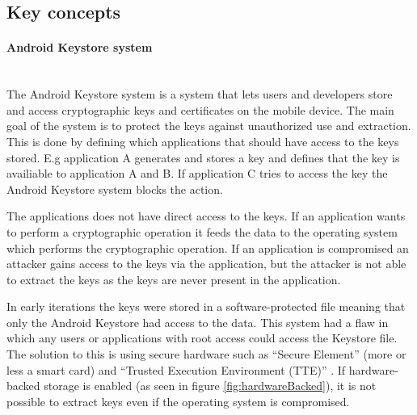\subsection{Key concepts}

\paragraph{Android Keystore system}\mbox{}\\
The Android Keystore system is a system that lets users and developers store and access cryptographic keys and certificates on the mobile device. The main goal of the system is to protect the keys against unauthorized use and extraction. This is done by defining which applications that should have access to the keys stored. E.g application A generates and stores a key and defines that the key is availiable to application A and B. If application C tries to access the key the Android Keystore system blocks the action.

The applications does not have direct access to the keys. If an application wants to perform a cryptographic operation it feeds the data to the operating system which performs the cryptographic operation. If an application is compromised an attacker gains access to the keys via the application, but the attacker is not able to extract the keys as the keys are never present in the application.

In early iterations the keys were stored in a software-protected file meaning that only the Android Keystore had access to the data. This system had a flaw in which any users or applications with root access could access the Keystore file. The solution to this is using secure hardware such as ``Secure Element'' (more or less a smart card) and ``Trusted Execution Environment (TTE)'' \cite{TEE}. If hardware-backed storage is enabled (as seen in figure \ref{fig:hardwareBacked}), it is not possible to extract keys even if the operating system is compromised.

